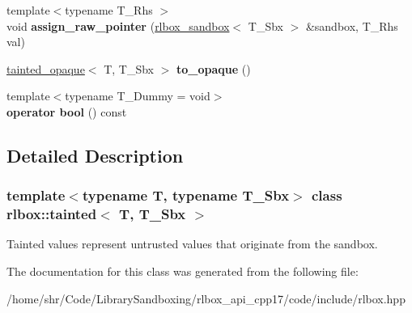 \begin{DoxyCompactItemize}
{\footnotesize template$<$typename T\+\_\+\+Rhs $>$ }\\void {\bfseries assign\+\_\+raw\+\_\+pointer} (\hyperlink{classrlbox_1_1rlbox__sandbox}{rlbox\+\_\+sandbox}$<$ T\+\_\+\+Sbx $>$ \&sandbox, T\+\_\+\+Rhs val)
\item 
\mbox{\label{classrlbox_1_1tainted_a7396dc3297186d7c10dd8bc031627a78}} 
\hyperlink{classrlbox_1_1tainted__opaque}{tainted\+\_\+opaque}$<$ T, T\+\_\+\+Sbx $>$ {\bfseries to\+\_\+opaque} ()
\item 
\mbox{\label{classrlbox_1_1tainted_a43e697ce5c9a1b853e786cae10105a52}} 
{\footnotesize template$<$typename T\+\_\+\+Dummy  = void$>$ }\\{\bfseries operator bool} () const
\end{DoxyCompactItemize}


\subsection{Detailed Description}
\subsubsection*{template$<$typename T, typename T\+\_\+\+Sbx$>$\newline
class rlbox\+::tainted$<$ T, T\+\_\+\+Sbx $>$}

Tainted values represent untrusted values that originate from the sandbox. 

The documentation for this class was generated from the following file\+:\begin{DoxyCompactItemize}
\item 
/home/shr/\+Code/\+Library\+Sandboxing/rlbox\+\_\+api\+\_\+cpp17/code/include/rlbox.\+hpp\end{DoxyCompactItemize}

